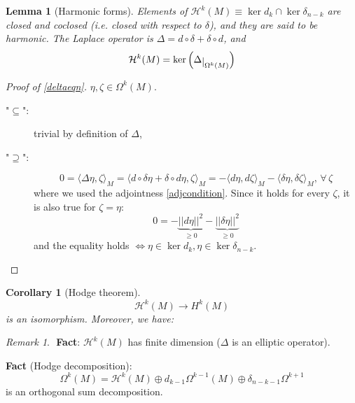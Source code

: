 \documentclass[a4paper,11pt,titlepage, article, oneside]{memoir}
\numberwithin{equation}{section}
\newtheorem{corollary}[theorem]{Corollary}
\newtheorem{lemma}[theorem]{Lemma}
\theoremstyle{definition}
\theoremstyle{remark}
\newtheorem{remark}[theorem]{Remark}
\newcommand{\restrict}[2]{{#1}\raisebox{-.5ex}{$|$}_{#2}}
\begin{document}
\begin{lemma}[Harmonic forms]
Elements of $\mathcal{H}^k(M) \equiv \ker d_k \cap \ker \delta_{n-k}$ are closed and coclosed (i.e. closed with respect to $\delta$), and they are said to be harmonic. The Laplace operator is $\Delta = d \circ \delta + \delta \circ d$, and 
\begin{equation} \label{deltaeqn}
\mathcal{H}^k(M) = \ker \left ( \restrict{\Delta}{\Omega^k(M)} \right )
\end{equation}
\end{lemma}
\begin{proof}[Proof of \ref{deltaeqn}]
$\eta, \zeta \in \Omega^k(M)$.
\begin{description}
\item["$\subseteq$":] trivial by definition of $\Delta$,
\item["$\supseteq$":] 
$$0 = \langle \Delta \eta, \zeta \rangle_M = \langle d \circ \delta \eta + \delta \circ d \eta, \zeta \rangle_M =- \langle d \eta, d \zeta \rangle_M - \langle \delta \eta, \delta \zeta \rangle_M, \, \forall\, \zeta$$
where we used the adjointness \eqref{adjcondition}. Since it holds for every $\zeta$, it is also true for $\zeta = \eta$:
$$0 = - \underbrace{|| d \eta ||^2}_{\ge 0} - \underbrace{||\delta \eta||^2}_{\ge 0}$$
and the equality holds $\Leftrightarrow \eta \in \ker d_k, \eta \in \ker \delta_{n-k}$.\qedhere
\end{description}
\end{proof}

\begin{corollary}[Hodge theorem]
\begin{equation}
\mathcal{H}^k(M) \rightarrow H^k(M)
\end{equation}
is an isomorphism. Moreover, we have:
\begin{center}
\end{center}
\end{corollary}

\begin{remarkbox}\begin{remark}
$ $\newline
\textbf{Fact}: $\mathcal{H}^k(M)$ has finite dimension ($\Delta$ is an elliptic operator).

\textbf{Fact} (Hodge decomposition):
$$\Omega^k(M) = \mathcal{H}^k(M) \oplus d_{k-1} \Omega^{k-1}(M) \oplus \delta_{n-k-1} \Omega^{k+1}$$
is an orthogonal sum decomposition.
\end{remark} \end{remarkbox}
\end{document}
